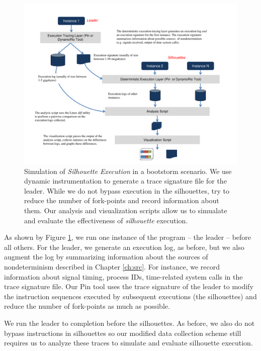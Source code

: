 \begin{figure}[]
  \center
  \includegraphics[scale=0.75, trim=2cm 0cm 1cm 0cm]
                  {simulation.pdf}
  \caption[Simulation of {\em Silhouette Execution} in a bootstorm scenario]%
  {Simulation of {\em Silhouette Execution} in a bootstorm scenario.
    We use dynamic instrumentation to 
    generate a trace signature file for the leader.
    While we do not bypass execution in the 
    silhouettes, try to reduce the number of fork-points 
    and record information about them.
    Our analysis and visualization
    scripts allow us to simualate and evaluate
    the effectiveness of {\em silhouette} execution.
  }
  \label{ch3:figsimulation}
\end{figure}


As shown by Figure \ref{ch3:figsimulation}, we run one instance of the
program -- the leader -- before all others.
For the leader, we generate an execution log, as before,
but we also augment the log by summarizing information about the sources of nondeterminism
described in Chapter \ref{ch:src}. For instance, we record
information about signal timing, process IDs, time-related system calls
in the trace signature file. Our Pin tool
uses the trace signature of the leader
to modify the instruction sequences executed by subsequent
executions (the silhouettes) and reduce the number of fork-points
as much as possible.

We run the leader to completion before the silhouettes.
As before, we also do not bypass instructions in silhouettes
so our modified data collection scheme still requires us
to analyze these traces to simulate and evaluate
silhouette execution.

